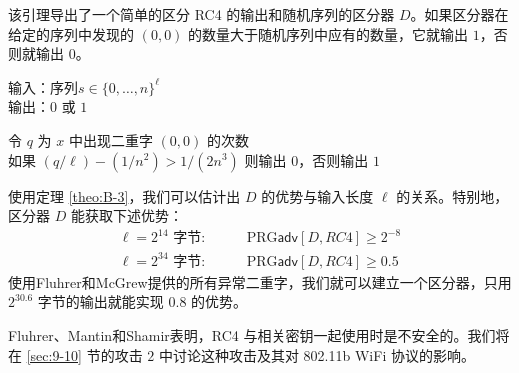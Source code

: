该引理导出了一个简单的区分 RC4 的输出和随机序列的区分器 $D$。如果区分器在给定的序列中发现的 $(0,0)$ 的数量大于随机序列中应有的数量，它就输出 $1$，否则就输出 $0$。

\vspace*{5pt}

\hspace*{5pt} 输入：序列$s\in\{0,\dots,n\}^\ell$\\
\hspace*{26pt} 输出：$0$ 或 $1$

\vspace{3pt}

\hspace*{5pt} 令 $q$ 为 $x$ 中出现二重字 $(0,0)$ 的次数\\
\hspace*{26pt} 如果 $(q/\ell)-(1/n^2)>1/(2n^3)$ 则输出 $0$，否则输出 $1$

\vspace*{5pt}

使用定理 \ref{theo:B-3}，我们可以估计出 $D$ 的优势与输入长度 $\ell$ 的关系。特别地，区分器 $D$ 能获取下述优势：
\[
\begin{aligned}
\ell=2^{14}\text{ 字节}: &\quad\quad \mathrm{PRG}\mathsf{adv}[D,RC4]\geq2^{-8}\\
\ell=2^{34}\text{ 字节}: &\quad\quad \mathrm{PRG}\mathsf{adv}[D,RC4]\geq0.5
\end{aligned}
\]
使用Fluhrer和McGrew提供的所有异常二重字，我们就可以建立一个区分器，只用 $2^{30.6}$ 字节的输出就能实现 $0.8$ 的优势。

\begin{snote}
Fluhrer、Mantin和Shamir表明，RC4 与相关密钥一起使用时是不安全的。我们将在 \ref{sec:9-10} 节的攻击 $2$ 中讨论这种攻击及其对 802.11b WiFi 协议的影响。
\end{snote}